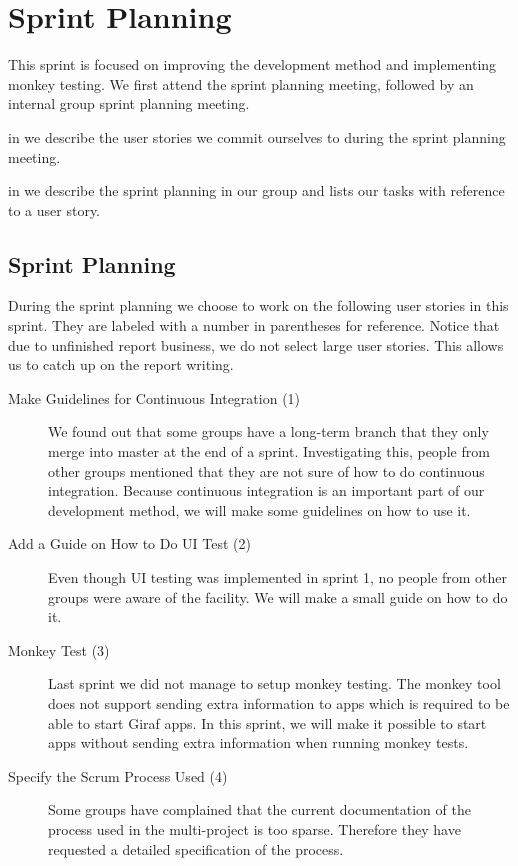 \chapter{Sprint Planning}\label{chap:s3_sprintplanning}
This sprint is focused on improving the development method and implementing monkey testing. We first attend the \bd sprint planning meeting, followed by an internal group sprint planning meeting.

\begin{chapterorganization}
  \item in  we describe the user stories we commit ourselves to during the \bd sprint planning meeting.
  \item in  we describe the sprint planning in our group and lists our tasks with reference to a user story.
\end{chapterorganization}

\section{\bdtitle Sprint Planning}\label{sec:S3_bd}
During the \bd sprint planning we choose to work on the following user stories in this sprint. They are labeled with a number in parentheses for reference. Notice that due to unfinished report business, we do not select large user stories. This allows us to catch up on the report writing.

\begin{description}
  \item[Make Guidelines for Continuous Integration (1)] We found out that some groups have a long-term branch that they only merge into master at the end of a sprint. Investigating this, people from other groups mentioned that they are not sure of how to do continuous integration. Because continuous integration is an important part of our development method, we will make some guidelines on how to use it.
  \item[Add a Guide on How to Do UI Test (2)] Even though UI testing was implemented in sprint 1, no people from other groups were aware of the facility. We will make a small guide on how to do it.
  \item[Monkey Test (3)] Last sprint we did not manage to setup monkey testing. The monkey tool does not support sending extra information to apps which is required to be able to start Giraf apps. In this sprint, we will make it possible to start apps without sending extra information when running monkey tests.
  \item[Specify the Scrum Process Used (4)] Some groups have complained that the current documentation of the process used in the multi-project is too sparse. Therefore they have requested a detailed specification of the process.
\end{description}

